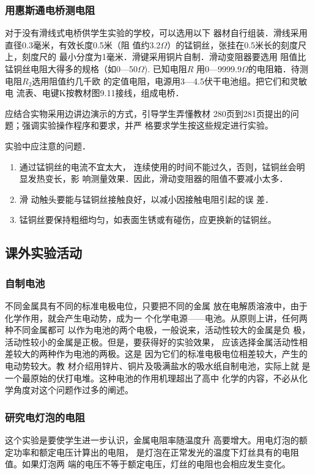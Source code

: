 \subsubsection{用惠斯通电桥测电阻}
对于没有滑线式电桥供学生实验的学校，可以选用以下
器材自行组装．滑线采用直径0.3毫米，有效长度0.5米（阻
值约3.2$\Omega$）的锰铜丝，张挂在0.5米长的刻度尺上，刻度尺的
最小分度为1毫米．滑键采用铜片自制．滑动变阻器要选用
阻值比锰铜丝电阻大得多的规格（如0—50$\Omega$). 已知电阻$R$
用0—9999.9$\Omega$的电阻箱．待测电阻$R_2$选用阻值约几千欧
的定值电阻，电源用3—4.5伏干电池组。把它们和灵敏电
流表、电键K按教材图9.11接线，组成电桥．

应结合实物采用边讲边演示的方式，引导学生弄懂教材
280页到281页提出的问题；强调实验操作程序和要求，并严
格要求学生按这些规定进行实验。

实验中应注意的问题．
\begin{enumerate}
\item 通过锰铜丝的电流不宜太大，
连续使用的时间不能过久，否则，锰铜丝会明显发热变长，影
响测量效果．因此，滑动变阻器的阻值不要减小太多．    
\item 滑
动触头要能与锰铜丝接触良好，以减小因接触电阻引起的误
差．    
\item 锰铜丝要保持粗细均匀，如表面生锈或有碰伤，应更换新的锰铜丝。
\end{enumerate}

\subsection{课外实验活动}
\subsubsection{自制电池}
不同金属具有不同的标准电极电位，只要把不同的金属
放在电解质溶液中，由于化学作用，就会产生电动势，成为一
个化学电源——电池。从原则上讲，任何两种不同金属都可
以作为电池的两个电极，一般说来，活动性较大的金属是负
极，活动性较小的金属是正极。但是，要获得好的实验效果，
应该选择金属活动性相差较大的两种作为电池的两极。这是
因为它们的标准电极电位相差较大，产生的电动势较大。教
材介绍用锌片、铜片及吸满盐水的吸水纸自制电池，实际上就
是一个最原始的伏打电堆。这种电池的作用机理超出了高中
化学的内容，不必从化学角度对这个问题作过多的阐述。

\subsubsection{研究电灯泡的电阻}

这个实验是要使学生进一步认识，金属电阻率随温度升
高要增大。用电灯泡的额定功率和额定电压计算出的电阻，
是灯泡在正常发光的温度下灯丝具有的电阻值。如果灯泡两
端的电压不等于额定电压，灯丝的电阻也会相应发生变化。


